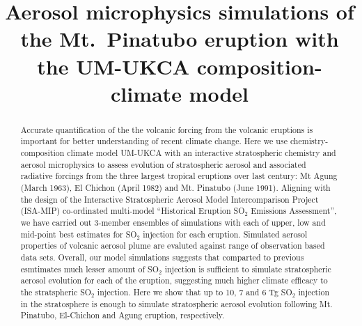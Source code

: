 \documentclass[acpd, hvmath, online]{copernicus_discussions}
\begin{document}
\title{Aerosol microphysics simulations of the Mt.~Pinatubo eruption with the UM-UKCA composition-climate model}










\maketitle



\begin{abstract}
Accurate quantification of the the volcanic forcing from the volcanic eruptions is important for better understanding of recent climate change.
Here we use chemistry-composition climate model UM-UKCA with an interactive stratospheric chemistry and aerosol microphysics
to assess evolution of stratospheric aerosol and associated radiative forcings from the three largest tropical 
eruptions over last century: Mt Agung (March 1963), El Chichon (April 1982) and Mt. Pinatubo (June 1991). 
Aligning with the design of the Interactive Stratospheric Aerosol Model Intercomparison Project (ISA-MIP)
co-ordinated multi-model “Historical Eruption SO$_2$ Emissions Assessment”, we have 
carried out 3-member ensembles of simulations with each of upper, low and mid-point best estimates for SO$_2$ injection
for each eruption. Simulated aerosol properties of volcanic aerosol plume are evaluted against range of
observation based data sets. Overall, our model simulations suggests that comparted to previous esmtimates 
much lesser amount of SO$_2$ injection is sufficient to simulate stratospheric aerosol evolution for each of the eruption, suggesting 
much higher climate efficacy to the stratspheric SO$_2$ injection. 
Here we show that  up to 10, 7 and 6 Tg  SO$_2$ injection in the stratosphere is
enough to simulate stratospheric aerosol evolution following Mt. Pinatubo, El-Chichon and Agung eruption, respectively. 
\end{abstract}
\end{document}
